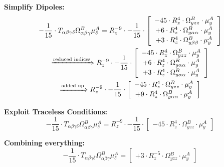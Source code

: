 \documentclass{article}
\begin{document}
\textbf{Simplify Dipoles:}
\begin{subequations}\begin{gather}
- \frac{1}{15} \cdot T_{\alpha{}\beta{}\gamma{}\delta{}} \Omega{}^{B}_{\alpha{}\beta{}\gamma{}} \mu{}^{A}_{\delta{}} = R_{z}^{-9} \cdot - \frac{1}{15} \cdot  \left[ \begin{array}{c} 
 		- 45 \cdot R_{z}^{4} \cdot \Omega{}^{B}_{yzz} \cdot \mu{}^{A}_{y} 
 \\[0.2em] 		 + 6 \cdot R_{z}^{4} \cdot \Omega{}^{B}_{y\alpha{}\alpha{}} \cdot \mu{}^{A}_{y} 
 \\[0.2em] 		 + 3 \cdot R_{z}^{4} \cdot \Omega{}^{B}_{y\beta{}\beta{}} \cdot \mu{}^{A}_{y}
 \end{array}\right] 
\\ \xRightarrow{\text{reduced indices}}
 R_{z}^{-9} \cdot - \frac{1}{15} \cdot  \left[ \begin{array}{c} 
 		- 45 \cdot R_{z}^{4} \cdot \Omega{}^{B}_{yzz} \cdot \mu{}^{A}_{y} 
 \\[0.2em] 		 + 6 \cdot R_{z}^{4} \cdot \Omega{}^{B}_{y\alpha{}\alpha{}} \cdot \mu{}^{A}_{y} 
 \\[0.2em] 		 + 3 \cdot R_{z}^{4} \cdot \Omega{}^{B}_{y\alpha{}\alpha{}} \cdot \mu{}^{A}_{y}
 \end{array}\right] 
\\ \xRightarrow{\text{added up}}
 R_{z}^{-9} \cdot - \frac{1}{15} \cdot  \left[ \begin{array}{c} 
 		- 45 \cdot R_{z}^{4} \cdot \Omega{}^{B}_{yzz} \cdot \mu{}^{A}_{y} 
 \\[0.2em] 		 + 9 \cdot R_{z}^{4} \cdot \Omega{}^{B}_{y\alpha{}\alpha{}} \cdot \mu{}^{A}_{y}
 \end{array}\right] 
\end{gather}\end{subequations}


\textbf{Exploit Traceless Conditions:}
\begin{equation}
- \frac{1}{15} \cdot T_{\alpha{}\beta{}\gamma{}\delta{}} \Omega{}^{B}_{\alpha{}\beta{}\gamma{}} \mu{}^{A}_{\delta{}} = R_{z}^{-9} \cdot - \frac{1}{15} \cdot  \left[ \begin{array}{c} 
 		- 45 \cdot R_{z}^{4} \cdot \Omega{}^{B}_{yzz} \cdot \mu{}^{A}_{y}
 \end{array}\right] 
\end{equation}


\textbf{Combining everything:}
\begin{equation}
- \frac{1}{15} \cdot T_{\alpha{}\beta{}\gamma{}\delta{}} \Omega{}^{B}_{\alpha{}\beta{}\gamma{}} \mu{}^{A}_{\delta{}} =  \left[ \begin{array}{c} 
 		+ 3 \cdot R_{z}^{-5} \cdot \Omega{}^{B}_{yzz} \cdot \mu{}^{A}_{y}
 \end{array}\right] 
\end{equation}
\end{document}
